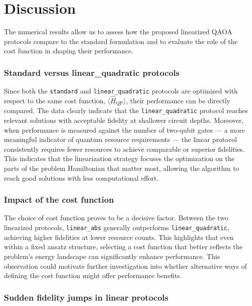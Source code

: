 \chapter{Discussion}
\label{Chapter:Discussion}

The numerical results allow us to assess how the proposed linearized QAOA protocols compare to the standard formulation and to evaluate the role of the cost function in shaping their performance.

\subsection*{Standard versus linear\_quadratic protocols}

Since both the \texttt{standard} and \texttt{linear\_quadratic} protocols are optimized with respect to the same cost function, $\langle \hat{H}_\mathrm{QP} \rangle$, their performance can be directly compared. The data clearly indicate that the \texttt{linear\_quadratic} protocol reaches relevant solutions with acceptable fidelity at shallower circuit depths. Moreover, when performance is measured against the number of two-qubit gates --- a more meaningful indicator of quantum resource requirements --- the linear protocol consistently requires fewer resources to achieve comparable or superior fidelities. This indicates that the linearization strategy focuses the optimization on the parts of the problem Hamiltonian that matter most, allowing the algorithm to reach good solutions with less computational effort.

\subsection*{Impact of the cost function}

The choice of cost function proves to be a decisive factor. Between the two linearized protocols, \texttt{linear\_abs} generally outperforms \texttt{linear\_quadratic}, achieving higher fidelities at lower resource counts. This highlights that even within a fixed ansatz structure, selecting a cost function that better reflects the problem's energy landscape can significantly enhance performance. This observation could motivate further investigation into whether alternative ways of defining the cost function might offer performance benefits.

\subsection*{Sudden fidelity jumps in linear protocols}

